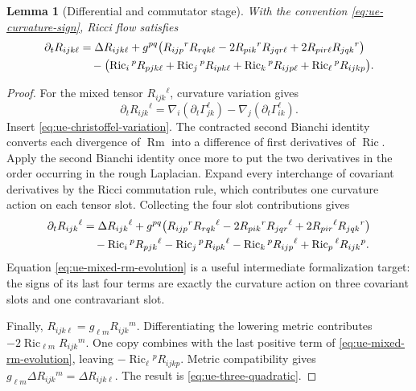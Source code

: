 \documentclass[10pt]{coll-l}
\newtheorem{lemma}[theorem]{Lemma}
\theoremstyle{definition}
\theoremstyle{remark}
\numberwithin{section}{chapter}
\numberwithin{equation}{chapter}
\newcommand{\Ric}{\operatorname{Ric}}
\newcommand{\Rm}{\operatorname{Rm}}
\begin{document}
\begin{lemma}[Differential and commutator stage]
\label{lem:ue-three-quadratic-evolution}
With the convention \eqref{eq:ue-curvature-sign}, Ricci flow satisfies
\begin{align}
 \partial_tR_{ijk\ell}
 &=\Delta R_{ijk\ell}
   +g^{pq}\bigl(
       R_{ijp}{}^{r}R_{rqk\ell}
       -2R_{pik}{}^{r}R_{jqr\ell}
       +2R_{pir\ell}R_{jqk}{}^{r}
     \bigr)                                                \label{eq:ue-three-quadratic}\\
 &\quad-
  \bigl(
    \Ric_i{}^pR_{pjk\ell}
   +\Ric_j{}^pR_{ipk\ell}
   +\Ric_k{}^pR_{ijp\ell}
   +\Ric_\ell{}^pR_{ijkp}
  \bigr).\notag
\end{align}
\end{lemma}

\begin{proof}
For the mixed tensor $R_{ijk}{}^\ell$, curvature variation gives
\begin{equation}
 \partial_tR_{ijk}{}^\ell
   =\nabla_i(\partial_t\Gamma_{jk}^{\ell})
      -\nabla_j(\partial_t\Gamma_{ik}^{\ell}).             \label{eq:ue-curvature-variation}
\end{equation}
Insert \eqref{eq:ue-christoffel-variation}.  The contracted second Bianchi
identity converts each divergence of $\Rm$ into a difference of first
derivatives of $\Ric$.  Apply the second Bianchi identity once more to put
the two derivatives in the order occurring in the rough Laplacian.  Expand
every interchange of covariant derivatives by the Ricci commutation rule,
which contributes one curvature action on each tensor slot.  Collecting the
four slot contributions gives
\begin{align}
 \partial_tR_{ijk}{}^\ell
 &=\Delta R_{ijk}{}^\ell
   +g^{pq}\bigl(
       R_{ijp}{}^{r}R_{rqk}{}^\ell
       -2R_{pik}{}^{r}R_{jqr}{}^\ell
       +2R_{pir}{}^\ell R_{jqk}{}^{r}
     \bigr)                                                \label{eq:ue-mixed-rm-evolution}\\
 &\quad-
  \Ric_i{}^pR_{pjk}{}^\ell
  -\Ric_j{}^pR_{ipk}{}^\ell
  -\Ric_k{}^pR_{ijp}{}^\ell
  +\Ric_p{}^\ell R_{ijk}{}^p .\notag
\end{align}
Equation \eqref{eq:ue-mixed-rm-evolution} is a useful intermediate
formalization target: the signs of its last four terms are exactly the
curvature action on three covariant slots and one contravariant slot.

Finally, $R_{ijk\ell}=g_{\ell m}R_{ijk}{}^m$.  Differentiating the lowering
metric contributes $-2\Ric_{\ell m}R_{ijk}{}^m$.  One copy combines with
the last positive term of \eqref{eq:ue-mixed-rm-evolution}, leaving
$-\Ric_\ell{}^pR_{ijkp}$.  Metric compatibility gives
$g_{\ell m}\Delta R_{ijk}{}^m=\Delta R_{ijk\ell}$.  The result is
\eqref{eq:ue-three-quadratic}.
\end{proof}
\end{document}
